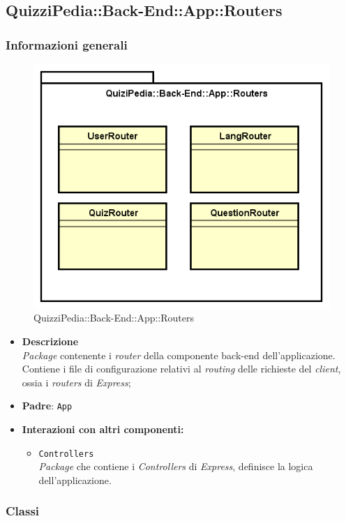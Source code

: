 \subsection{QuizziPedia::Back-End::App::Routers}
\subsubsection{Informazioni generali}
\label{QuizziPedia::Back-End::App::Routers}
\begin{figure}
	\centering
	\includegraphics[scale=0.45]{UML/Package/QuizziPedia_Back-End_App_Routers.png}
	\caption{QuizziPedia::Back-End::App::Routers}
\end{figure}
\FloatBarrier
	\begin{itemize}
		\item \textbf{Descrizione} \\
		\textit{Package} contenente i \textit{router} della componente back-end dell'applicazione. Contiene i file di configurazione relativi al \textit{routing} delle richieste del \textit{client}, ossia i \textit{routers} di \textit{Express};
		\item \textbf{Padre}: \texttt{App}
		\item \textbf{Interazioni con altri componenti:}
			\begin{itemize}
				\item \texttt{Controllers} \\
				\textit{Package} che contiene i \textit{Controllers} di \textit{Express}, definisce la logica dell'applicazione.
			\end{itemize}
	\end{itemize}
\subsubsection{Classi}





